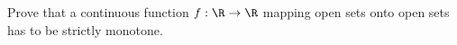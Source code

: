Prove that a continuous function $f:\R\rightarrow \R$ mapping open
sets onto open sets has to be strictly monotone.
